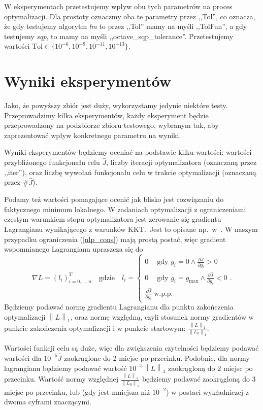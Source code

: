 \documentclass[licencjacka]{pracamgr}
\newcommand{\norm}[1]{\left\lVert#1\right\rVert}
\begin{document}
W eksperymentach przetestujemy wpływ obu tych parametrów na proces optymalizacji. Dla prostoty oznaczmy oba te parametry przez ,,Tol'', co oznacza, że gdy testujemy algorytm {\it lm\/} to przez ,,Tol'' mamy na myśli ,,TolFun'', a gdy testujemy {\it sqp}, to mamy na myśli ,,octave\_sqp\_tolerance''. Przetestujemy wartości $\text{Tol} \in \{10^{-6}, 10^{-9}, 10^{-11}, 10^{-13}\}$. 

\section{Wyniki eksperymentów}
Jako, że powyższy zbiór jest duży, wykorzystamy jedynie niektóre testy. Przeprowadzimy kilka eksperymentów, każdy eksperyment będzie przeprowadzony na podzbiorze zbioru testowego, wybranym tak, aby zaprezentować wpływ konkretnego parametru na wyniki.

Wyniki eksperymentów będziemy oceniać na podstawie kilku wartości: wartości przybliżonego funkcjonału celu $\hat{J}$, liczby iteracji optymalizatora (oznaczaną przez ,,iter''), oraz liczbę wywołań funkcjonału celu w trakcie optymalizacji (oznaczaną przez $\#\hat{J}$).

Podamy też wartości pomagające ocenić jak blisko jest rozwiązaniu do faktycznego minimum lokalnego. W zadaniach optymalizacji z ograniczeniami częstym warunkiem stopu optymalizatora jest zerowanie się gradientu Lagrangianu wynikającego z warunków KKT.\ Jest to opisane np.\ w~\cite{diehl}. W naszym przypadku ograniczenia (\ref{nlp_cons}) mają prostą postać, więc gradient wspomnianego Lagrangianu upraszcza się do
\begin{equation}\label{lagrangian}
  \nabla L = {(l_i)}^T_{i = 0,\ldots, n} \quad \text{gdzie} \quad
  l_i = \begin{cases}
    0\ \quad \text{gdy } g_i = 0 \land \frac{\partial \hat{J}}{\partial g_i} > 0 \\
    0\ \quad \text{gdy } g_i = g_{\max} \land \frac{\partial \hat{J}}{\partial g_i} < 0 \\
    \frac{\partial \hat{J}}{\partial g_i}\ \text{w.p.p.}
  \end{cases}
  .
\end{equation}
Będziemy podawać normę gradientu Lagrangianu dla punktu zakończenia optymalizacji $\norm{L}_1$, oraz normę względną, czyli stosunek normy gradientów w punkcie zakończenia optymalizacji i w punkcie startowym: $\frac{\norm{L}_1}{\norm{L_0}_1}$.

Wartości funkcji celu są duże, więc dla zwiększenia czytelności będziemy podawać wartości dla $10^{-5}\hat{J}$ zaokrąglone do 2 miejsc po przecinku. Podobnie, dla normy lagrangianu będziemy podawać wartość $10^{-5}\norm{L}_1$ zaokrągloną do 2 miejsc po przecinku. Wartość normy względnej $\frac{\norm{L}_1}{\norm{L_0}_1}$ będziemy podawać zaokrągloną do 3 miejsc po przecinku, lub (gdy jest mniejsza niż $10^{-2}$) w postaci wykładniczej z dwoma cyframi znaczącymi.
\end{document}
